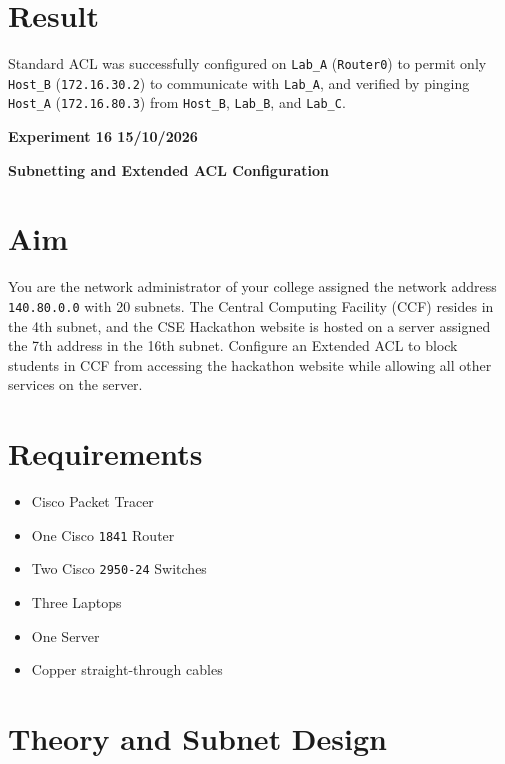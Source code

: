 \documentclass[12pt, a4paper]{report}
\begin{document}
\section*{Result}
Standard ACL was successfully configured on \texttt{Lab\_A} (\texttt{Router0}) to permit only \texttt{Host\_B} (\texttt{172.16.30.2}) to communicate with \texttt{Lab\_A}, and verified by pinging \texttt{Host\_A} (\texttt{172.16.80.3}) from \texttt{Host\_B}, \texttt{Lab\_B}, and \texttt{Lab\_C}.


\newpage 
\begin{center}
	\bfseries 
	Experiment 16 \hfill 15/10/2026
\end{center}
\label{exp:16}
\begin{center}
	{\bfseries \Huge Subnetting and Extended ACL Configuration \par}
\end{center}

\section*{Aim}
You are the network administrator of your college assigned the network address \texttt{140.80.0.0} with 20 subnets. The Central Computing Facility (CCF) resides in the 4th subnet, and the CSE Hackathon website is hosted on a server assigned the 7th address in the 16th subnet. Configure an Extended ACL to block students in CCF from accessing the hackathon website while allowing all other services on the server.

\section*{Requirements}
\begin{itemize}
	\item Cisco Packet Tracer
	\item One Cisco \texttt{1841} Router 
	\item Two Cisco \texttt{2950-24} Switches
	\item Three Laptops 
	\item One Server 
	\item Copper straight-through cables
\end{itemize}

\section*{Theory and Subnet Design}
\end{document}
